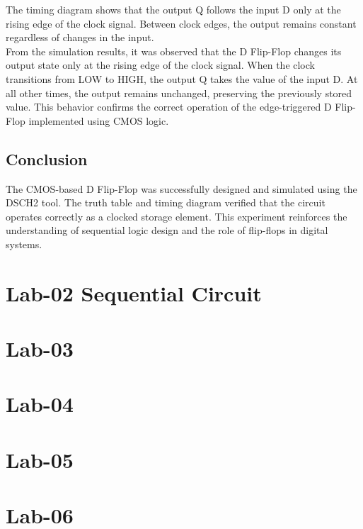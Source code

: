 \documentclass[12pt]{report}
\begin{document}
The timing diagram shows that the output Q follows the input D only at the rising edge of the clock signal. Between clock edges, the output remains constant regardless of changes in the input. \\
From the simulation results, it was observed that the D Flip-Flop changes its output state only at the rising edge of the clock signal. When the clock transitions from LOW to HIGH, the output Q takes the value of the input D. At all other times, the output remains unchanged, preserving the previously stored value. This behavior confirms the correct operation of the edge-triggered D Flip-Flop implemented using CMOS logic.

\section{Conclusion}
The CMOS-based D Flip-Flop was successfully designed and simulated using the DSCH2 tool. The truth table and timing diagram verified that the circuit operates correctly as a clocked storage element. This experiment reinforces the understanding of sequential logic design and the role of flip-flops in digital systems.



\chapter{Lab-02 Sequential Circuit}



\chapter{Lab-03}


\chapter{Lab-04 }

\chapter{Lab-05 }

\chapter{Lab-06 }
\end{document}
